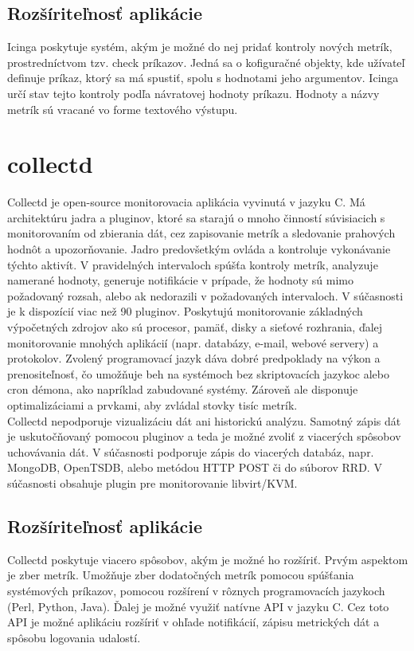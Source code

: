 \documentclass[11pt,final,oneside]{fithesis}
\begin{document}
\subsection{Rozšíriteľnosť aplikácie}
Icinga poskytuje systém, akým je možné do nej pridať kontroly nových metrík, prostredníctvom tzv. check príkazov. Jedná sa o kofiguračné objekty, kde užívateľ definuje príkaz,
ktorý sa má spustiť, spolu s hodnotami jeho argumentov. Icinga určí stav tejto kontroly podľa návratovej hodnoty príkazu.\cite{08} Hodnoty a názvy metrík sú vracané vo forme textového výstupu.

\section{collectd}
Collectd je open-source monitorovacia aplikácia vyvinutá v jazyku C. Má architektúru jadra a pluginov, ktoré sa starajú o mnoho činností súvisiacich s monitorovaním od zbierania dát, cez
zapisovanie metrík a sledovanie prahových hodnôt a upozorňovanie. Jadro predovšetkým ovláda a kontroluje vykonávanie týchto aktivít. V pravidelných intervaloch spúšťa kontroly metrík, 
analyzuje namerané hodnoty, generuje notifikácie v prípade, že hodnoty sú mimo požadovaný rozsah, alebo ak nedorazili 
v požadovaných intervaloch. V súčasnosti je k dispozícií viac než 90 pluginov. Poskytujú monitorovanie základných výpočetných zdrojov ako sú procesor, pamäť, disky a sieťové rozhrania, ďalej monitorovanie
mnohých aplikácií (napr. databázy, e-mail, webové servery) a protokolov. Zvolený programovací jazyk dáva dobré predpoklady na výkon a prenositeľnosť, čo umožňuje beh na systémoch bez 
skriptovacích jazykoc alebo cron démona, ako napríklad zabudované systémy. Zároveň ale disponuje optimalizáciami a prvkami, aby zvládal stovky tisíc metrík. \cite{22} 
\\Collectd nepodporuje vizualizáciu dát ani historickú analýzu. Samotný zápis dát je uskutočňovaný pomocou pluginov a teda je možné zvoliť z viacerých spôsobov uchovávania dát. V súčasnosti podporuje 
zápis do viacerých databáz, napr. MongoDB, OpenTSDB, alebo metódou HTTP POST či do súborov RRD. V súčasnosti obsahuje plugin pre monitorovanie
libvirt/KVM.

\subsection{Rozšíriteľnosť aplikácie}
Collectd poskytuje viacero spôsobov, akým je možné ho rozšíriť. Prvým aspektom je zber metrík. Umožňuje zber dodatočných metrík pomocou
spúšťania systémových príkazov, pomocou rozšírení v rôznych programovacích jazykoch (Perl, Python, Java). Ďalej je možné využiť natívne
API v jazyku C. Cez toto API je možné aplikáciu rozšíriť v ohľade notifikácií, zápisu metrických dát a spôsobu logovania udalostí.
\end{document}
